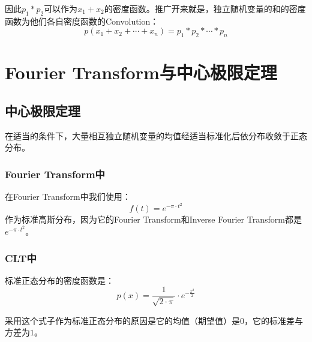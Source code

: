 因此$p_1*p_2$可以作为$x_1+x_2$的密度函数。推广开来就是，独立随机变量的和的密度函数为他们各自密度函数的Convolution：
\begin{equation}
	p(x_1+x_2+\cdots+x_n)=p_1*p_2*\cdots *p_n
\end{equation}

\section{Fourier Transform与中心极限定理}
\subsection{中心极限定理}
在适当的条件下，大量相互独立随机变量的均值经适当标准化后依分布收敛于正态分布。
\subsubsection{Fourier Transform中}
在Fourier Transform中我们使用：
$$
	f(t)=e^{-\pi\cdot t^2}
$$
作为标准高斯分布，因为它的Fourier Transform和Inverse Fourier Transform都是$e^{-\pi\cdot t^2}$。
\subsubsection{CLT中}
标准正态分布的密度函数是：
$$
	p(x)=\frac{1}{\sqrt{2\cdot\pi}}\cdot e^{-\frac{x^2}{2}}
$$

采用这个式子作为标准正态分布的原因是它的均值（期望值）是$0$，它的标准差与方差为$1$。

